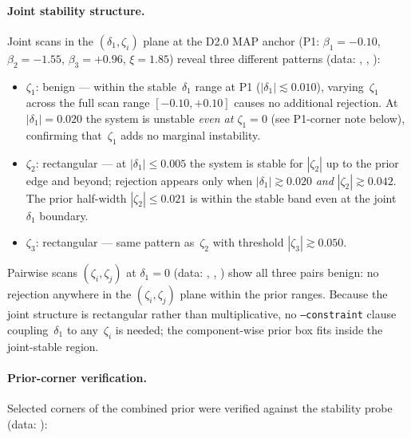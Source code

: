 \paragraph{Joint stability structure.}
Joint scans in the $(\delta_1,\zeta_i)$ plane at the D2.0 MAP anchor
(P1: $\beta_1=-0.10$, $\beta_2=-1.55$, $\beta_3=+0.96$, $\xi=1.85$)
reveal three different patterns
(data: , ,
):
\begin{itemize}
  \item \textbf{$\zeta_1$}: benign --- within the stable~$\delta_1$
    range at P1 ($|\delta_1|\lesssim 0.010$), varying~$\zeta_1$ across
    the full scan range $[-0.10,+0.10]$ causes no additional
    rejection.  At $|\delta_1|=0.020$ the system is unstable
    \emph{even at $\zeta_1=0$} (see P1-corner note below), confirming
    that~$\zeta_1$ adds no marginal instability.
  \item \textbf{$\zeta_2$}: rectangular --- at $|\delta_1|\le0.005$
    the system is stable for $|\zeta_2|$ up to the prior edge and
    beyond; rejection appears only when $|\delta_1|\gtrsim 0.020$
    \emph{and} $|\zeta_2|\gtrsim 0.042$.  The prior half-width
    $|\zeta_2|\le0.021$ is within the stable band even at the
    joint~$\delta_1$ boundary.
  \item \textbf{$\zeta_3$}: rectangular --- same pattern as~$\zeta_2$
    with threshold $|\zeta_3|\gtrsim 0.050$.
\end{itemize}
Pairwise scans $(\zeta_i,\zeta_j)$ at $\delta_1=0$
(data: , ,
) show all three pairs benign: no rejection
anywhere in the $(\zeta_i,\zeta_j)$ plane within the prior ranges.
Because the joint structure is rectangular rather than multiplicative,
no \texttt{--constraint} clause coupling~$\delta_1$ to any~$\zeta_i$
is needed; the component-wise prior box fits inside the joint-stable
region.

\paragraph{Prior-corner verification.}
Selected corners of the combined prior were verified against the
stability probe
(data: ):

